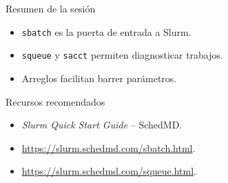 \documentclass[aspectratio=169,professionalfonts]{beamer}
\begin{document}
\begin{frame}[fragile]{Resumen de la sesión}
  \begin{itemize}
    \item \texttt{sbatch} es la puerta de entrada a Slurm.
    \item \texttt{squeue} y \texttt{sacct} permiten diagnosticar trabajos.
    \item Arreglos facilitan barrer parámetros.
  \end{itemize}
\end{frame}

\begin{frame}[fragile]{Recursos recomendados}
  \begin{itemize}
    \item \textit{Slurm Quick Start Guide} – SchedMD.
    \item \url{https://slurm.schedmd.com/sbatch.html}.
    \item \url{https://slurm.schedmd.com/squeue.html}.
  \end{itemize}
\end{frame}
\end{document}
